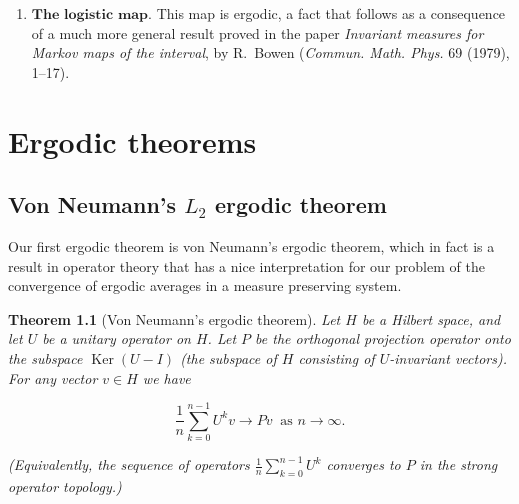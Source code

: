 \documentclass[11pt]{report}
\theoremstyle{plain}
\newtheorem{thm}{Theorem}[chapter]
\theoremstyle{definition}
\begin{document}
\begin{enumerate}[label=\arabic*.]
\item $\textbf{The logistic map.}$ This map is ergodic, a
fact that follows as a consequence of a much more
general result proved in the paper \emph{Invariant measures
for Markov maps of the interval}, by R.\ Bowen
(\emph{Commun. Math. Phys.} 69 (1979), 1--17).
\end{enumerate}

\chapter{Ergodic theorems}

\section{Von Neumann's $L_2$ ergodic theorem}

Our first ergodic theorem is von Neumann's ergodic
theorem, which in fact is a result in operator theory
that has a nice interpretation for our problem of the
convergence of ergodic averages in a measure
preserving system.

\begin{thm}[Von Neumann's ergodic theorem]
\label{thm-vonneumann}
Let $H$ be a Hilbert space, and let $U$ be a unitary
operator on $H$. Let $P$ be the orthogonal projection
operator onto the subspace $\operatorname{Ker}(U-I)$
(the subspace of $H$ consisting of $U$-invariant
vectors). For any vector $v\in H$ we have

\begin{equation*} \tag{17}\label{eq:vonneumann}
\frac{1}{n}\sum_{k=0}^{n-1} U^k v \to Pv \ \textrm{ as }n\to\infty.
\end{equation*}

\noindent (Equivalently, the sequence of operators
$\frac{1}{n}\sum_{k=0}^{n-1} U^k$ converges to $P$ in
the strong operator topology.)
\end{thm}
\end{document}
